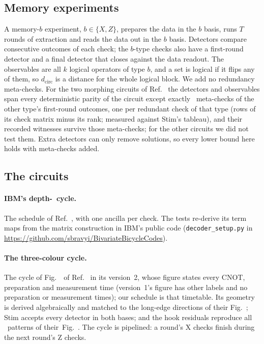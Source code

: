 \documentclass[aps,pra,twocolumn,superscriptaddress,nofootinbib,longbibliography,floatfix]{revtex4-2}
\newcommand{\dc}{d_{\mathrm{circ}}}
\begin{document}
\subsection{Memory experiments}

A memory-$b$ experiment, $b\in\{X,Z\}$, prepares the data in the $b$ basis, runs $T$ rounds of extraction and reads the data out in the $b$ basis. Detectors compare consecutive outcomes of each check; the $b$-type checks also have a first-round detector and a final detector that closes against the data readout. The observables are all $k$ logical operators of type $b$, and a set is logical if it flips any of them, so $\dc$ is a distance for the whole logical block. We add no redundancy meta-checks. For the two morphing circuits of Ref.~\cite{shaw2024lowering} the detectors and observables span every deterministic parity of the circuit except exactly \MetaChecks\ meta-checks of the other type's first-round outcomes, one per redundant check of that type (rows of its check matrix minus its rank; measured against Stim's tableau), and their recorded witnesses survive those meta-checks; for the other circuits we did not test them. Extra detectors can only remove solutions, so every lower bound here holds with meta-checks added.

\subsection{The circuits}
\label{sec:circuits}

\paragraph*{IBM's depth-\IbmDepth\ cycle.} The schedule of Ref.~\cite{bravyi2024high}, with one ancilla per check. The tests re-derive its term maps from the matrix construction in IBM's public code (\texttt{decoder\_setup.py} in \url{https://github.com/sbravyi/BivariateBicycleCodes}).

\paragraph*{The three-colour cycle.} The cycle of Fig.~\SBBFigCycle\ of Ref.~\cite{strikis2026high} in its version~2, whose figure states every CNOT, preparation and measurement time (version~1's figure has other labels and no preparation or measurement times); our schedule is that timetable. Its geometry is derived algebraically and matched to the long-edge directions of their Fig.~\SBBFigGeom; Stim accepts every detector in both bases; and the hook residuals reproduce all \SBBResiduals\ patterns of their~Fig.~\SBBFigResid. The cycle is pipelined: a round's X checks finish during the next round's Z checks.
\end{document}
